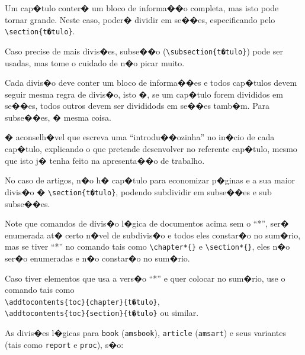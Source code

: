 \documentclass[12pt,a4paper,oneside, openany, titlepage]{book}
\begin{document}
Um cap�tulo conter� um bloco de informa��o completa, mas isto pode tornar grande.
Neste caso, poder� dividir em se��es, 
especificando pelo \verb+\section{t�tulo}+.

Caso precise de mais divis�es, subse��o (\verb+\subsection{t�tulo}+) 
pode ser usadas, mas tome o cuidado de n�o picar muito.

Cada divis�o deve conter um bloco de informa��es e todos cap�tulos devem 
seguir mesma regra de divis�o, isto �, se um cap�tulo forem divididos 
em se��es, todos outros devem ser divididods em se��es tamb�m. 
Para subse��es, � mesma coisa.

� aconselh�vel que escreva uma ``introdu��ozinha'' no in�cio de 
cada cap�tulo, explicando o que pretende desenvolver no referente 
cap�tulo, mesmo que isto j� tenha feito na apresenta��o de trabalho.

No caso de artigos, n�o h� cap�tulo para economizar p�ginas e 
a sua maior divis�o �  \verb+\section{t�tulo}+, 
podendo subdividir em subse��es e sub subse��es.

Note que comandos de divis�o l�gica de documentos acima sem o ``*'', 
ser� enumerada at� certo n�vel de subdivis�o e todos eles constar�o 
no sum�rio, mas se tiver ``*'' no comando tais como 
\verb+\chapter*{}+ e \verb+\section*{}+, 
eles n�o ser�o enumeradas e n�o constar�o no sum�rio.

Caso tiver elementos que usa a vers�o ``*'' e quer colocar no
sum�rio, use o comando tais como \\
\verb+\addtocontents{toc}{chapter}{t�tulo}+, \\
\verb+\addtocontents{toc}{section}{t�tulo}+ ou similar.


As divis�es l�gicas para \texttt{book} (\texttt{amsbook}), 
\texttt{article} (\texttt{amsart}) e seus variantes 
(tais como \texttt{report} e \texttt{proc}), s�o:
\end{document}
